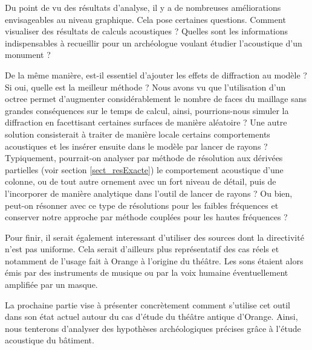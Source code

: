 Du point de vu des résultats d'analyse, il y a de nombreuses améliorations envisageables au niveau graphique. Cela pose certaines questions. Comment visualiser des résultats de calculs acoustiques ? Quelles sont les informations indispensables à recueillir pour un archéologue voulant étudier l'acoustique d'un monument ? 

De la même manière, est-il essentiel d'ajouter les effets de diffraction au modèle ? Si oui, quelle est la meilleur méthode ? Nous avons vu que l'utilisation d'un \gls{octree} permet d'augmenter considérablement le nombre de faces du maillage sans grandes conséquences sur le temps de calcul, ainsi, pourrions-nous simuler la diffraction en facettisant certaines surfaces de manière aléatoire ? Une autre solution consisterait à traiter de manière locale certains comportements acoustiques et les insérer ensuite dans le modèle par lancer de rayons ? Typiquement, pourrait-on analyser par méthode de résolution aux dérivées partielles (voir section \ref{sect_resExacte}) le comportement acoustique d'une colonne, ou de tout autre ornement avec un fort niveau de détail, puis de l'incorporer de manière analytique dans l'outil de lancer de rayons ? Ou bien, peut-on résonner avec ce type de résolutions pour les faibles fréquences et conserver notre approche par méthode couplées pour les hautes fréquences ?

Pour finir, il serait également interessant d'utiliser des sources dont la directivité n'est pas uniforme. Cela serait d'ailleurs plus représentatif des cas réels et notamment de l'usage fait à Orange à l'origine du théâtre. Les sons étaient alors émis par des instruments de musique ou par la voix humaine éventuellement amplifiée par un masque.

 La prochaine partie vise à présenter concrètement comment s'utilise cet outil dans son état actuel autour du cas d'étude du théâtre antique d'Orange. Ainsi, nous tenterons d'analyser des hypothèses archéologiques précises grâce à l'étude acoustique du bâtiment.




\newpage
	
 
 
